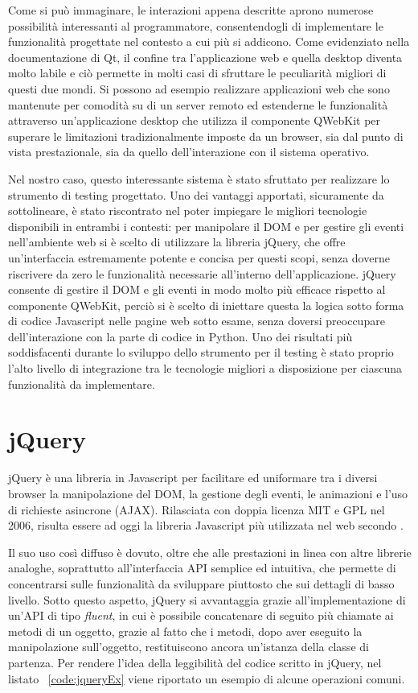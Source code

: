 Come si può immaginare, le interazioni appena descritte aprono numerose possibilità interessanti al programmatore, consentendogli di implementare le funzionalità progettate nel contesto a cui più si addicono. Come evidenziato nella documentazione di Qt, il confine tra l'applicazione web e quella desktop diventa molto labile e ciò permette in molti casi di sfruttare le peculiarità migliori di questi due mondi. Si possono ad esempio realizzare applicazioni web che sono mantenute per comodità su di un server remoto ed estenderne le funzionalità attraverso un'applicazione desktop che utilizza il componente QWebKit per superare le limitazioni tradizionalmente imposte da un browser, sia dal punto di vista prestazionale, sia da quello dell'interazione con il sistema operativo.

Nel nostro caso, questo interessante sistema è stato sfruttato per realizzare lo strumento di testing progettato. Uno dei vantaggi apportati, sicuramente da sottolineare, è stato riscontrato nel poter impiegare le migliori tecnologie disponibili in entrambi i contesti: per manipolare il DOM e per gestire gli eventi nell'ambiente web si è scelto di utilizzare la libreria jQuery, che offre un'interfaccia estremamente potente e concisa per questi scopi, senza doverne riscrivere da zero le funzionalità  necessarie all'interno dell'applicazione. jQuery consente di gestire il DOM e gli eventi in modo molto più efficace rispetto al componente QWebKit, perciò si è scelto di iniettare questa la logica sotto forma di codice Javascript nelle pagine web sotto esame, senza doversi preoccupare dell'interazione con la parte di codice in Python. Uno dei risultati più soddisfacenti durante lo sviluppo dello strumento per il testing è stato proprio l'alto livello di integrazione tra le tecnologie migliori a disposizione per ciascuna funzionalità da implementare.


\section{jQuery}

jQuery è una libreria in Javascript per facilitare ed uniformare tra i diversi browser la manipolazione del DOM, la gestione degli eventi, le animazioni e l'uso di richieste asincrone (AJAX). Rilasciata con doppia licenza MIT e GPL nel 2006, risulta essere ad oggi la libreria Javascript più utilizzata nel web secondo \cite{builtwith}. 

Il suo uso così diffuso è dovuto, oltre che alle prestazioni in linea con altre librerie analoghe, soprattutto all'interfaccia API semplice ed intuitiva, che permette di concentrarsi sulle funzionalità da sviluppare piuttosto che sui dettagli di basso livello. Sotto questo aspetto, jQuery si avvantaggia grazie all'implementazione di un'API di tipo \emph{fluent}, in cui è possibile concatenare di seguito più chiamate ai metodi di un oggetto, grazie al fatto che i metodi, dopo aver eseguito la manipolazione sull'oggetto, restituiscono ancora un'istanza della classe di partenza. Per rendere l'idea della leggibilità del codice scritto in jQuery, nel listato ~\ref{code:jqueryEx} viene riportato un esempio di alcune operazioni comuni.

